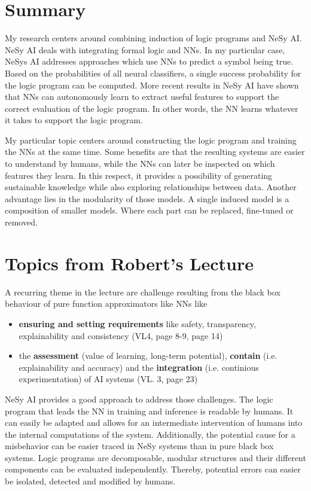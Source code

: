 \documentclass[11pt]{article}
\begin{document}
\newpage

\section*{Summary}

My research centers around combining induction of logic programs and \ac{NeSy} AI. \ac{NeSy} AI deals with integrating formal logic and \acp{NN}. In my particular case, \acp{NeSy} AI addresses approaches which use \acp{NN} to predict a symbol being true. Based on the probabilities of all neural classifiers, a single success probability for the logic program can be computed. More recent results in \ac{NeSy} AI have shown that \acp{NN} can autonomously learn to extract useful features to support the correct evaluation of the logic program. In other words, the \ac{NN} learns whatever it takes to support the logic program.

My particular topic centers around constructing the logic program and training the \acp{NN} at the same time. Some benefits are that the resulting systems are easier to understand by humans, while the \acp{NN} can later be inspected on which features they learn. In this respect, it provides a possibility of generating sustainable knowledge while also exploring relationships between data. Another advantage lies in the modularity of those models. A single induced model is a composition of smaller models. Where each part can be replaced, fine-tuned or removed.


\section*{Topics from Robert's Lecture}

A recurring theme in the lecture are challenge resulting from the black box behaviour of pure function approximators like \acp{NN} like
\begin{itemize}
  \setlength{\itemsep}{0pt}
  \item \textbf{ensuring and setting requirements} like safety, transparency, explainability and consistency (VL4, page 8-9, page 14)
  \item the \textbf{assessment} (value of learning, long-term potential), \textbf{contain} (i.e. explainability and accuracy) and the \textbf{integration} (i.e. continious experimentation) of AI systems (VL. 3, page 23)
\end{itemize}
\ac{NeSy} AI provides a good approach to address those challenges. The logic program that leads the \ac{NN} in training and inference is readable by humans. It can easily be adapted and allows for an intermediate intervention of humans into the internal computations of the system. Additionally, the potential cause for a misbehavior can be easier traced in \ac{NeSy} systems than in pure black box systems. Logic programs are decomposable, modular structures and their different components can be evaluated independently. Thereby, potential errors can easier be isolated, detected and modified by humans.
\end{document}
